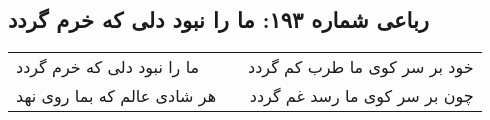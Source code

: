 \begin{center}
\section*{رباعی شماره ۱۹۳: ما را نبود دلی که خرم گردد}
\label{sec:sh193}
\begin{longtable}{l p{0.5cm} r}
ما را نبود دلی که خرم گردد
&&
خود بر سر کوی ما طرب کم گردد
\\
هر شادی عالم که بما روی نهد
&&
چون بر سر کوی ما رسد غم گردد
\\
\end{longtable}
\end{center}
